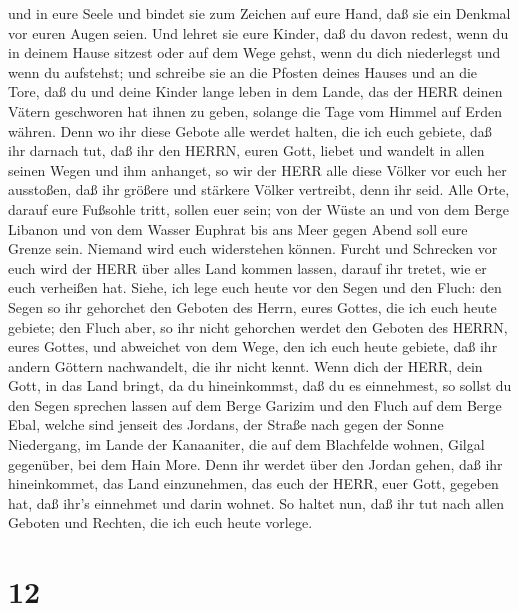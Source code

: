und in eure Seele und bindet sie zum Zeichen auf eure Hand, daß sie ein
Denkmal vor euren Augen seien.  Und lehret sie eure Kinder,
daß du davon redest, wenn du in deinem Hause sitzest oder auf dem Wege
gehst, wenn du dich niederlegst und wenn du aufstehst;  und
schreibe sie an die Pfosten deines Hauses und an die Tore, 
daß du und deine Kinder lange leben in dem Lande, das der HERR deinen
Vätern geschworen hat ihnen zu geben, solange die Tage vom Himmel auf
Erden währen.  Denn wo ihr diese Gebote alle werdet halten,
die ich euch gebiete, daß ihr darnach tut, daß ihr den HERRN, euren
Gott, liebet und wandelt in allen seinen Wegen und ihm anhanget,
 so wir der HERR alle diese Völker vor euch her ausstoßen,
daß ihr größere und stärkere Völker vertreibt, denn ihr seid.
 Alle Orte, darauf eure Fußsohle tritt, sollen euer sein;
von der Wüste an und von dem Berge Libanon und von dem Wasser Euphrat
bis ans Meer gegen Abend soll eure Grenze sein.  Niemand
wird euch widerstehen können. Furcht und Schrecken vor euch wird der
HERR über alles Land kommen lassen, darauf ihr tretet, wie er euch
verheißen hat.  Siehe, ich lege euch heute vor den Segen
und den Fluch:  den Segen so ihr gehorchet den Geboten des
Herrn, eures Gottes, die ich euch heute gebiete;  den Fluch
aber, so ihr nicht gehorchen werdet den Geboten des HERRN, eures Gottes,
und abweichet von dem Wege, den ich euch heute gebiete, daß ihr andern
Göttern nachwandelt, die ihr nicht kennt.  Wenn dich der
HERR, dein Gott, in das Land bringt, da du hineinkommst, daß du es
einnehmest, so sollst du den Segen sprechen lassen auf dem Berge Garizim
und den Fluch auf dem Berge Ebal,  welche sind jenseit des
Jordans, der Straße nach gegen der Sonne Niedergang, im Lande der
Kanaaniter, die auf dem Blachfelde wohnen, Gilgal gegenüber, bei dem
Hain More.  Denn ihr werdet über den Jordan gehen, daß ihr
hineinkommet, das Land einzunehmen, das euch der HERR, euer Gott,
gegeben hat, daß ihr's einnehmet und darin wohnet.  So
haltet nun, daß ihr tut nach allen Geboten und Rechten, die ich euch
heute vorlege.

\hypertarget{section-11}{%
\section{12}\label{section-11}}

